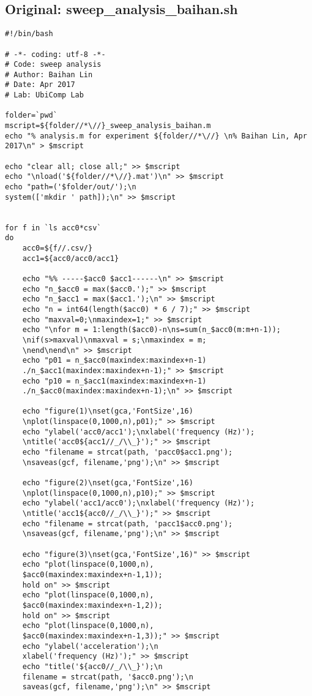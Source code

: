 \documentclass{sigchi}
\begin{document}
\subsection{Original: sweep\_analysis\_baihan.sh}\label{ss:swp_ana.sh}
\begin{lstlisting}
#!/bin/bash

# -*- coding: utf-8 -*-
# Code: sweep analysis
# Author: Baihan Lin
# Date: Apr 2017
# Lab: UbiComp Lab

folder=`pwd`
mscript=${folder//*\//}_sweep_analysis_baihan.m
echo "% analysis.m for experiment ${folder//*\//} \n% Baihan Lin, Apr 2017\n" > $mscript

echo "clear all; close all;" >> $mscript
echo "\nload('${folder//*\//}.mat')\n" >> $mscript
echo "path=('$folder/out/');\n
system(['mkdir ' path]);\n" >> $mscript


for f in `ls acc0*csv`
do
    acc0=${f//.csv/}
    acc1=${acc0/acc0/acc1}

	echo "%% -----$acc0 $acc1------\n" >> $mscript
    echo "n_$acc0 = max($acc0.');" >> $mscript
    echo "n_$acc1 = max($acc1.');\n" >> $mscript
    echo "n = int64(length($acc0) * 6 / 7);" >> $mscript
    echo "maxval=0;\nmaxindex=1;" >> $mscript
    echo "\nfor m = 1:length($acc0)-n\ns=sum(n_$acc0(m:m+n-1));
    \nif(s>maxval)\nmaxval = s;\nmaxindex = m;
    \nend\nend\n" >> $mscript
    echo "p01 = n_$acc0(maxindex:maxindex+n-1)
    ./n_$acc1(maxindex:maxindex+n-1);" >> $mscript
    echo "p10 = n_$acc1(maxindex:maxindex+n-1)
    ./n_$acc0(maxindex:maxindex+n-1);\n" >> $mscript

	echo "figure(1)\nset(gca,'FontSize',16)
    \nplot(linspace(0,1000,n),p01);" >> $mscript
	echo "ylabel('acc0/acc1');\nxlabel('frequency (Hz)');
    \ntitle('acc0${acc1//_/\\_}');" >> $mscript
	echo "filename = strcat(path, 'pacc0$acc1.png');
    \nsaveas(gcf, filename,'png');\n" >> $mscript

	echo "figure(2)\nset(gca,'FontSize',16)
    \nplot(linspace(0,1000,n),p10);" >> $mscript
	echo "ylabel('acc1/acc0');\nxlabel('frequency (Hz)');
    \ntitle('acc1${acc0//_/\\_}');" >> $mscript
	echo "filename = strcat(path, 'pacc1$acc0.png');
    \nsaveas(gcf, filename,'png');\n" >> $mscript

	echo "figure(3)\nset(gca,'FontSize',16)" >> $mscript
	echo "plot(linspace(0,1000,n),
    $acc0(maxindex:maxindex+n-1,1)); 
    hold on" >> $mscript
	echo "plot(linspace(0,1000,n),
    $acc0(maxindex:maxindex+n-1,2)); 
    hold on" >> $mscript
	echo "plot(linspace(0,1000,n),
    $acc0(maxindex:maxindex+n-1,3));" >> $mscript
	echo "ylabel('acceleration');\n
    xlabel('frequency (Hz)');" >> $mscript
	echo "title('${acc0//_/\\_}');\n
    filename = strcat(path, '$acc0.png');\n
    saveas(gcf, filename,'png');\n" >> $mscript


\end{lstlisting}
\end{document}
